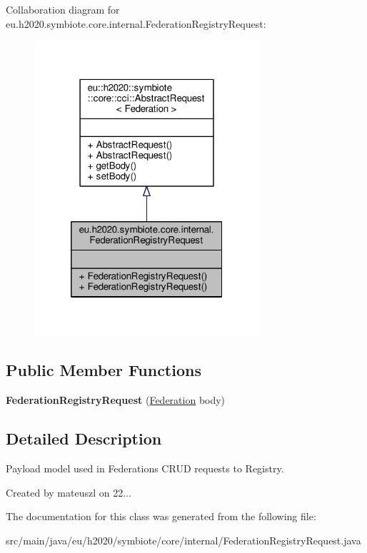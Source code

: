 Collaboration diagram for eu.\+h2020.\+symbiote.\+core.\+internal.\+Federation\+Registry\+Request\+:\nopagebreak
\begin{figure}[H]
\begin{center}
\leavevmode
\includegraphics[width=236pt]{classeu_1_1h2020_1_1symbiote_1_1core_1_1internal_1_1FederationRegistryRequest__coll__graph}
\end{center}
\end{figure}
\subsection*{Public Member Functions}
\begin{DoxyCompactItemize}
\item 
\mbox{\label{classeu_1_1h2020_1_1symbiote_1_1core_1_1internal_1_1FederationRegistryRequest_a7c65955df7cec5f61c0d2033de7426db}} 
{\bfseries Federation\+Registry\+Request} (\hyperlink{classeu_1_1h2020_1_1symbiote_1_1model_1_1mim_1_1Federation}{Federation} body)
\end{DoxyCompactItemize}


\subsection{Detailed Description}
Payload model used in Federations C\+R\+UD requests to Registry. 

Created by mateuszl on 22... 

The documentation for this class was generated from the following file\+:\begin{DoxyCompactItemize}
\item 
src/main/java/eu/h2020/symbiote/core/internal/Federation\+Registry\+Request.\+java\end{DoxyCompactItemize}
